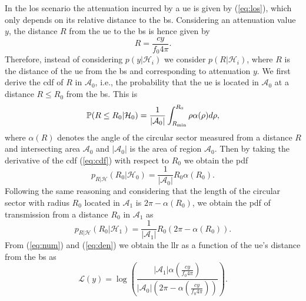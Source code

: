 \documentclass[conference,final]{IEEEtran}
\begin{document}
In the \ac{los} scenario the attenuation incurred by a \ac{ue} is given by (\ref{eq:los}), which only depends on its relative distance to the \ac{bs}. Considering an attenuation value $y$, the distance $R$ from the \ac{ue} to the \ac{bs} is hence given by 
\begin{equation}
    R = \frac{c y}{f_0 4 \pi}.
\end{equation}
Therefore, instead of considering $p(y|\mathcal H_i)$ we consider $p(R|\mathcal H_i)$, where $R$ is the distance of the \ac{ue} from the \ac{bs} and corresponding to attenuation $y$. We first derive the \ac{cdf} of $R$ in $\mathcal{A}_0$, i.e.,  the probability that the \ac{ue} is located in $\mathcal{A}_0$ at a distance $R\le R_0$ from the \ac{bs}. This is
\begin{equation}\label{eq:cdf}
     \mathbb{P}(R \le R_0|\mathcal{H}_0) = \frac{1}{|\mathcal{A}_0|}\int_{R_{\rm min}}^{R_0} \rho \alpha(\rho) d\rho,
\end{equation}
where $\alpha(R)$ denotes the angle of the circular sector measured from a distance $R$ and intersecting area $\mathcal{A}_0$ and $|\mathcal{A}_0|$ is the area of region $\mathcal{A}_0$. Then by taking the derivative of the \ac{cdf} (\ref{eq:cdf}) with respect to $R_0$ we obtain the \ac{pdf} 
\begin{equation}\label{eq:num}
    p_{R|\mathcal{H}}(R_0|\mathcal{H}_0) = \frac{1}{|\mathcal{A}_0|}R_0\alpha(R_0).
\end{equation}
Following the same reasoning and considering that the length of the circular sector with radius $R_0$ located in $\mathcal{A}_1$ is $2\pi - \alpha(R_0)$, we obtain the \ac{pdf} of transmission from a distance $R_0$ in $\mathcal{A}_1$ as
\begin{equation}\label{eq:den}
     p_{R|\mathcal{H}}(R_0|\mathcal{H}_1) = \frac{1}{|\mathcal{A}_1|}R_0\left(2\pi-\alpha(R_0)\right).
\end{equation}
From (\ref{eq:num}) and (\ref{eq:den}) we obtain the \ac{llr} as a function of the \ac{ue}'s distance from the \ac{bs} as 
\begin{equation}
    \mathcal{L}{(y)}=\log\left(\frac{|\mathcal{A}_1|\alpha \left(\frac{c y}{f_0 4 \pi}\right)}{|\mathcal{A}_0|\left(2\pi-\alpha\left(\frac{c y}{f_0 4 \pi}\right)\right)}\right).
\end{equation}
\end{document}
